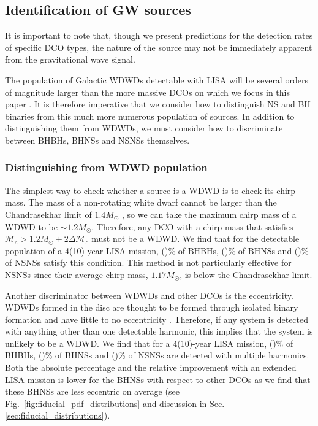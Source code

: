 \subsection{Identification of GW sources}
It is important to note that, though we present predictions for the detection rates of specific DCO types, the nature of the source may not be immediately apparent from the gravitational wave signal.

The population of Galactic WDWDs detectable with LISA will be several orders of magnitude larger than the more massive DCOs on which we focus in this paper \citep[e.g.][]{Korol+2017}. It is therefore imperative that we consider how to distinguish NS and BH binaries from this much more numerous population of sources. In addition to distinguishing them from WDWDs, we must consider how to discriminate between BHBHs, BHNSs and NSNSs themselves.

\subsubsection{Distinguishing from WDWD population}\label{sec:WDWD_distinguish}
The simplest way to check whether a source is a WDWD is to check its chirp mass. The mass of a non-rotating white dwarf cannot be larger than the Chandrasekhar limit of $1.4 \unit{M_\odot}$ \citep{Chandrasekhar+1931, Hamada+1961}, so we can take the maximum chirp mass of a WDWD to be $\sim 1.2 \unit{M_{\odot}}$. Therefore, any DCO with a chirp mass that satisfies $\mathcal{M}_c > 1.2 \unit{M_{\odot}} + 2 \Delta \mathcal{M}_c$ must not be a WDWD. We find that for the detectable population of a 4(10)-year LISA mission, \BHBHAboveMaxWDWDFourPerc{}(\BHBHAboveMaxWDWDTenPerc{})\% of BHBHs, \BHNSAboveMaxWDWDFourPerc{}(\BHNSAboveMaxWDWDTenPerc{})\% of BHNSs and \NSNSAboveMaxWDWDFourPerc{}(\NSNSAboveMaxWDWDTenPerc{})\% of NSNSs satisfy this condition. This method is not particularly effective for NSNSs since their average chirp mass, $1.17 \unit{M_\odot}$, is below the Chandrasekhar limit.

Another discriminator between WDWDs and other DCOs is the eccentricity. WDWDs formed in the disc are thought to be formed through isolated binary formation and have little to no eccentricity \citep[e.g.][]{Nelemans+2001}. Therefore, if any system is detected with anything other than one detectable harmonic, this implies that the system is unlikely to be a WDWD. We find that for a 4(10)-year LISA mission, \BHBHMultipleHarmonicsFourPerc{}(\BHBHMultipleHarmonicsTenPerc{})\% of BHBHs, \BHNSMultipleHarmonicsFourPerc{}(\BHNSMultipleHarmonicsTenPerc{})\% of BHNSs and \NSNSMultipleHarmonicsFourPerc(\NSNSMultipleHarmonicsTenPerc{})\% of NSNSs are detected with multiple harmonics. Both the absolute percentage and the relative improvement with an extended LISA mission is lower for the BHNSs with respect to other DCOs as we find that these BHNSs are less eccentric on average (see Fig.~\ref{fig:fiducial_pdf_distributions} and discussion in Sec. \ref{sec:fiducial_distributions}).

